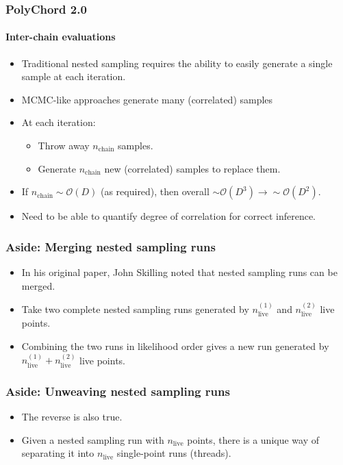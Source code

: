 \documentclass[]{beamer}
\newcommand{\nlive}{n_\mathrm{live}}
\begin{document}
\begin{frame}
  \frametitle{PolyChord 2.0}
  \framesubtitle{Inter-chain evaluations}
  \begin{itemize}
    \pause\item Traditional nested sampling requires the ability to easily generate a single sample at each iteration.
    \pause\item MCMC-like approaches generate many (correlated) samples
    \pause\item At each iteration:
      \begin{itemize}
        \pause\item Throw away $n_\mathrm{chain}$ samples.
        \pause\item Generate $n_\mathrm{chain}$ new (correlated) samples to replace them.
      \end{itemize}
    \pause\item If $n_\mathrm{chain}\sim\mathcal{O}(D)$ (as required), then overall $\sim\mathcal{O}(D^3)\to\sim\mathcal{O}(D^2)$.
    \pause\item Need to be able to quantify degree of correlation for correct inference.
  \end{itemize}
\end{frame}

\begin{frame}
  \frametitle{Aside: Merging nested sampling runs}

  \begin{itemize}
    \pause\item In his original paper, John Skilling noted that nested sampling runs can be merged.
    \pause\item Take two complete nested sampling runs generated by $\nlive^{(1)}$ and $\nlive^{(2)}$ live points.
    \pause\item Combining the two runs in likelihood order gives a new run generated by $\nlive^{(1)}+\nlive^{(2)}$ live points. 
  \end{itemize}

\end{frame}

\begin{frame}
  \frametitle{Aside: Unweaving nested sampling runs}

  \begin{itemize}
    \pause\item The reverse is also true.
    \pause\item Given a nested sampling run with $\nlive$ points, there is a unique way of separating it into $\nlive$ single-point runs (threads).
  \end{itemize}

\end{frame}
\end{document}
